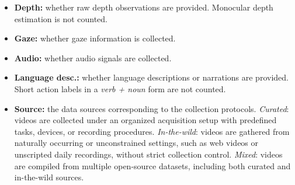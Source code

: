 \documentclass[Afour,sageh,times]{sagej}
\begin{document}
\begin{itemize}[leftmargin=1em]
    \item \textbf{Depth:} whether raw depth observations are provided. Monocular depth estimation is not counted.
    \item \textbf{Gaze:} whether gaze information is collected.
    \item \textbf{Audio:} whether audio signals are collected.
    \item \textbf{Language desc.:} whether language descriptions or narrations are provided. Short action labels in a \textit{verb + noun} form are not counted.
    \item \textbf{Source:} the data sources corresponding to the collection protocols. \textit{Curated}: videos are collected under an organized acquisition setup with predefined tasks, devices, or recording procedures. \textit{In-the-wild}: videos are gathered from naturally occurring or unconstrained settings, such as web videos or unscripted daily recordings, without strict collection control. \textit{Mixed}: videos are compiled from multiple open-source datasets, including both curated and in-the-wild sources.
\end{itemize}
\end{document}
